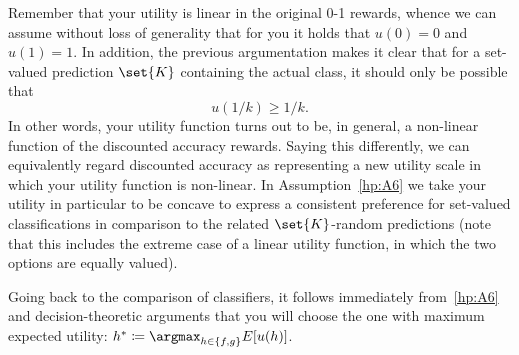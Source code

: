 \documentclass[a4paper,10pt,reqno]{amsart}
\theoremstyle{remark}
\begin{document}
Remember that your utility is linear in the original 0-1 rewards, whence we can assume without loss of generality that for you it holds that $u(0)=0$ and $u(1)=1$. In addition, the previous argumentation makes it clear that for a set-valued prediction $\set{K}$ containing the actual class, it should only be possible that $$u(1/k)\ge1/k.$$ In other words, your utility function turns out to be, in general, a non-linear function of the discounted accuracy rewards. Saying this differently, we can equivalently regard discounted accuracy as representing a new utility scale in which your utility function is non-linear. In Assumption~\ref{hp:A6} we take your utility in particular to be concave to express a consistent preference for set-valued classifications in comparison to the related $\set{K}$-random predictions (note that this includes the extreme case of a linear utility function, in which the two options are equally valued).

Going back to the comparison of classifiers, it follows immediately from~\ref{hp:A6} and decision-theoretic arguments that you will choose the one with maximum expected utility: $h^*\coloneqq \argmax_{h\in\{f,g\}}E[u(h)]$. 
\end{document}
